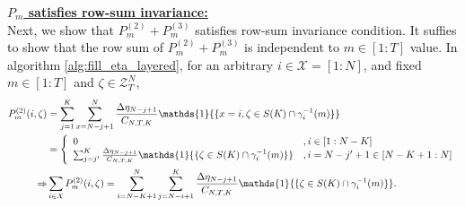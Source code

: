 \documentclass[11pt,letterpaper]{article}
\newcommand{\cX}{\mathcal{X}}
\newcommand{\cZ}{\mathcal{Z}}
\begin{document}
\underline{\textbf{$P_m$ satisfies row-sum invariance:}} \\
Next, we show that $P_m^{(2)}+P_m^{(3)}$ satisfies row-sum invariance condition. It suffies to show that the row sum of $P_m^{(2)}+P_m^{(3)}$ is independent to $m \in [1:T]$ value. 
In algorithm \ref{alg:fill_eta_layered}, for an arbitrary $i \in \cX = [1:N]$, and fixed $m \in [1:T]$ and $\zeta \in \cZ^N_T$,
\begin{align}
    P^{(2)}_m(i, \zeta)  & = \sum_{j=1}^{K} \sum_{x=N-j+1}^N \frac{\Delta\eta_{N-j+1}}{C_{N,T,K}}\mathds{1}{\{x = i, \zeta \in S(K) \cap \gamma_{i}^{-1}(m)\}} \notag \\
    & = \left\{ \begin{array}{ll}
         0 &, i \in [1:N-K]  \\
         \sum_{j=j'}^{K}  \frac{\Delta\eta_{N-j+1}}{C_{N,T,K}}\mathds{1}{\{ \zeta \in S(K) \cap \gamma_{i}^{-1}(m)\}} & , i=N-j'+1\in [N-K+1:N]
    \end{array}\right. \\
    \Rightarrow & \sum_{i \in \cX} P^{(2)}_m(i, \zeta) = \sum_{i=N-K+1}^N \sum_{j=N-i+1}^{K}  \frac{\Delta\eta_{N-j+1}}{C_{N,T,K}}\mathds{1}{\{ \zeta \in S(K) \cap \gamma_{i}^{-1}(m)\}} .\label{eq:sum_x_p2_first_appear}
\end{align}
\end{document}
